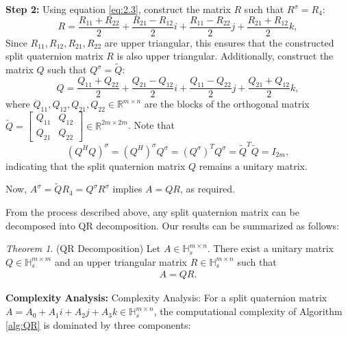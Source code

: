 \documentclass{book}
\makeatletter
\def\my@tag@font{\normalsize}
\let\amsmath@eqref\eqref
\renewcommand\eqref[1]{{\let\my@tag@font\relax\amsmath@eqref{#1}}}
\theoremstyle{remark}
\newtheorem{theorem}{\it\indent Theorem}[section]
\makeatother
\begin{document}
\begin{multicols}{2}
\textbf{Step 2:} Using equation \eqref{eq:2.3}, construct the matrix $R$ such that $R^\sigma=R_4:$
\begin{equation*}
R = \frac{R_{11} + R_{22}}{2} + \frac{R_{21} - R_{12}}{2}i + \frac{R_{11} - R_{22}}{2}j + \frac{R_{21} + R_{12}}{2}k,
\end{equation*}
Since $R_{11}, R_{12}, R_{21}, R_{22}$ are upper triangular, this ensures that the constructed split quaternion matrix $R$ is also upper triangular. Additionally, construct the matrix $Q$ such that $Q^\sigma=\widetilde{Q}:$
\begin{equation*}
Q = \frac{Q_{11} + Q_{22}}{2} + \frac{Q_{21} - Q_{12}}{2}i + \frac{Q_{11} - Q_{22}}{2}j + \frac{Q_{21} + Q_{12}}{2}k,
\end{equation*}
where $Q_{11}, Q_{12}, Q_{21}, Q_{22} \in \mathbb{R}^{m \times n}$ are the blocks of the orthogonal matrix $\widetilde{Q} = \begin{bmatrix} Q_{11} & Q_{12} \\ Q_{21} & Q_{22} \end{bmatrix} \in \mathbb{R}^{2m \times 2m}$. Note that \[(Q^H Q)^\sigma = {(Q^H)}^\sigma Q^\sigma = {(Q^\sigma)}^TQ^\sigma = \widetilde{Q}^T\widetilde{Q} = I_{2m},\] indicating that the split quaternion matrix $Q$ remains a unitary matrix.

Now, $A^\sigma=\widetilde{Q}R_4=Q^\sigma R^\sigma$ implies
$A = Q R$, as required.

From the process described above, any split quaternion matrix can be decomposed into QR decomposition. Our results can be summarized as follows:
\begin{theorem}(QR Decomposition)
    Let $A \in \mathbb{H}_s^{m \times n}$. There exist a unitary matrix $Q \in \mathbb{H}_s^{m \times m}$ and an upper triangular matrix $R \in \mathbb{H}_s^{m \times n}$ such that
    \begin{eqnarray}\label{eq:split QR}
        A = Q R.
    \end{eqnarray}
\end{theorem}

\textbf{Complexity Analysis:}
{Complexity Analysis:} For a split quaternion matrix $A = A_0 + A_1i + A_2j + A_3k \in \mathbb{H}_s^{m \times n}$, the computational complexity of Algorithm \ref{alg:QR} is dominated by three components:  


\end{multicols}
\end{document}
